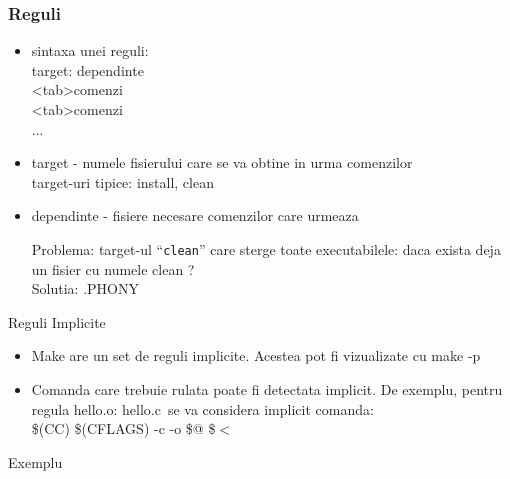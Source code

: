 \documentclass{beamer}
\begin{document}
    \begin{frame}[allowframebreaks]
    \frametitle{Reguli}
    \begin{itemize}
    \setlength{\itemsep}{0.3cm}
    \item sintaxa unei reguli:\\ \ttfamily target: dependinte\\ <tab>comenzi\\ <tab>comenzi\\ ...\normalfont
    \item target - numele fisierului care se va obtine in urma comenzilor\\target-uri tipice: install, clean
    \item dependinte - fisiere necesare comenzilor care urmeaza
    \begin{item} Problema: target-ul ``\texttt{clean}'' care sterge toate executabilele: daca exista deja un fisier cu numele clean ?\\Solutia: .PHONY\\
    \vspace{0.3cm}
    
    \end{item}
    \end{itemize}
    \end{frame}

    \begin{frame}{Reguli Implicite}
    \begin{itemize}
    \setlength{\itemsep}{0.5cm}
    \item Make are un set de reguli implicite. Acestea pot fi vizualizate cu \ttfamily make -p\normalfont
    \item Comanda care trebuie rulata poate fi detectata implicit. De exemplu, pentru regula \ttfamily hello.o: hello.c\normalfont \ se va considera implicit comanda:\\ {\ttfamily \$(CC) \$(CFLAGS) -c -o \$@ \$$<$}
    \end{itemize}
    \end{frame}

    \begin{frame}{Exemplu}
    
    \end{frame}
\end{document}
